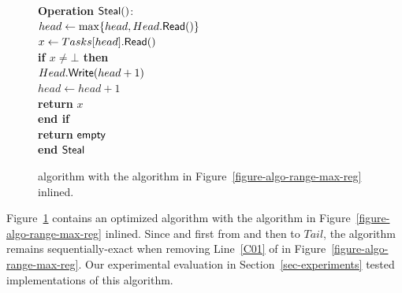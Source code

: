 \begin{figure}[!ht]
{{\begin{minipage}[t]{150mm}
\begin{tabbing}
          {\bf Operation} \({\sf \small Steal}()\): \\
           \> \> \(head \leftarrow \max\{head, Head.{\sf \small Read}()\}\)\\
           \> \> \(x \leftarrow Tasks[head].{\sf \small Read}()\) \\
           \> \> {\bf if \(x \neq \bot\) then}\\
           \> \> \> \(Head.{\sf \small Write}(head+1)\)\\
           \> \> \> \(head \leftarrow head+1\)\\
           \> \> \> {\bf return} \(x\)\\
           \> \> {\bf end if}\\
           \> \> {\bf return} ${\sf \small empty}$\\
          {\bf end} ${\sf \small Steal}$

        \end{tabbing}
      \end{minipage} }
    \caption{\label{figure-w-mult}\NCWSM algorithm with the \RangeMaxReg
      algorithm in Figure~\ref{figure-algo-range-max-reg} inlined.}
  }
\end{figure}


Figure~\ref{figure-w-mult} contains an optimized \NCWSM algorithm with the \RangeMaxReg algorithm in Figure~\ref{figure-algo-range-max-reg} inlined.  Since \Take and \Steal first \RMaxR from and then \RMaxW to \(Tail\), the algorithm remains sequentially-exact when removing Line~\ref{C01} of \RMaxW in Figure~\ref{figure-algo-range-max-reg}.  Our experimental evaluation in Section~\ref{sec-experiments} tested implementations of this algorithm.
